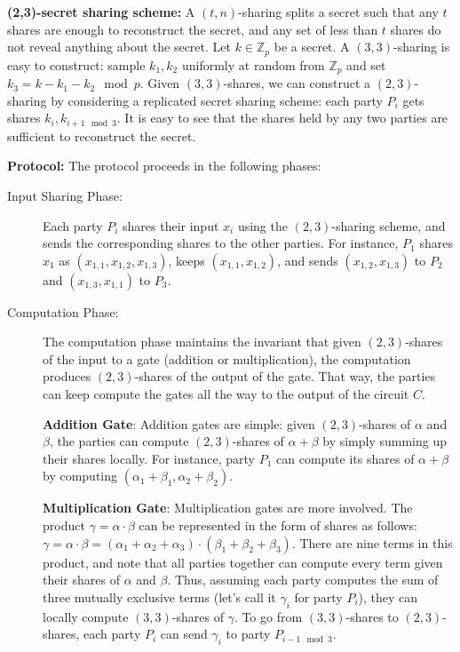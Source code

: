 \noindent\textbf{(2,3)-secret sharing scheme:}
A $(t,n)$-sharing splits a secret such that any $t$ shares are enough to reconstruct the secret, and any set of less than $t$ shares do not reveal anything about the secret.
Let $k \in \mathbb{Z}_p$ be a secret. A $(3,3)$-sharing is easy to construct: sample $k_1, k_2$ uniformly at random from $\mathbb{Z}_p$ and set $k_3 = k - k_1 - k_2 \mod p$.
Given $(3,3)$-shares, we can construct a $(2,3)$-sharing by considering a replicated secret sharing scheme: each party $P_i$ gets shares $k_i, k_{i+1 \mod 3}$. It is easy to see that the shares held by any two parties are sufficient to reconstruct the secret.

\noindent\textbf{Protocol:}
The protocol proceeds in the following phases:
\begin{description}
  \item[Input Sharing Phase:] 
  Each party $P_i$ shares their input $x_i$ using the $(2,3)$-sharing scheme, and sends the corresponding shares to the other parties.
  For instance, $P_1$ shares $x_1$ as $(x_{1,1}, x_{1,2}, x_{1,3})$, keeps $(x_{1,1}, x_{1,2})$, and sends $(x_{1,2}, x_{1,3})$ to $P_2$ and $(x_{1,3}, x_{1,1})$ to $P_3$.
  \item[Computation Phase:] 
  The computation phase maintains the invariant that given $(2,3)$-shares of the input to a gate (addition or multiplication), the computation produces $(2,3)$-shares of the output of the gate. That way, the parties can keep compute the gates all the way to the output of the circuit $C$.

  \textbf{Addition Gate}:
  Addition gates are simple: given $(2,3)$-shares of $\alpha$ and $\beta$, the parties can compute $(2,3)$-shares of $\alpha + \beta$ by simply summing up their shares locally.
  For instance, party $P_1$ can compute its shares of $\alpha+\beta$ by computing $(\alpha_1 + \beta_1, \alpha_2 + \beta_2)$. 

  \textbf{Multiplication Gate}:
  Multiplication gates are more involved. The product $\gamma = \alpha \cdot \beta$ can be represented in the form of shares as follows: $\gamma = \alpha \cdot \beta = (\alpha_1 + \alpha_2 + \alpha_3) \cdot (\beta_1 + \beta_2 + \beta_3)$.
  There are nine terms in this product, and note that all parties together can compute every term given their shares of $\alpha$ and $\beta$. 
  Thus, assuming each party computes the sum of three mutually exclusive terms (let's call it $\gamma_i$ for party $P_i$), they can locally compute $(3,3)$-shares of $\gamma$.
  To go from $(3,3)$-shares to $(2,3)$-shares, each party $P_i$ can send $\gamma_i$ to party $P_{i-1 \mod 3}$.


\end{description}
